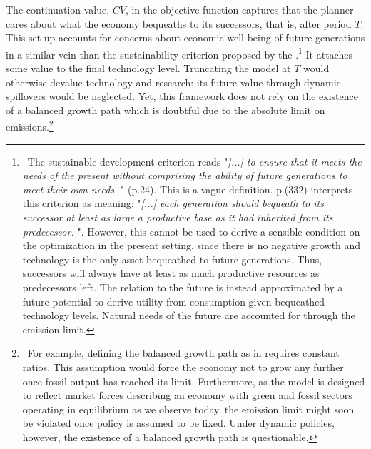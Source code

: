 The continuation value, $CV$, in the objective function captures that the planner cares about what the economy bequeaths to its successors, that is, after period $T$. 
This set-up accounts for concerns about economic well-being of future generations in a similar vein than the sustainability criterion proposed by the \cite{UNSUS}.\footnote{\ The sustainable development criterion reads "\textit{[...] to ensure that it meets the needs of the present without comprising the ability of future generations to meet their own needs.
	}" (p.24). This is a vague definition.  \cite{Dasgupta2021} p.(332) interprets this criterion as meaning: 
	"\textit{[...] each generation should bequeath to its successor at least as large a productive base as it had inherited from its predecessor. }". 
	However, this cannot be used to derive a sensible condition on the optimization in the present setting, since there is no negative growth and technology is the only asset bequeathed to future generations. Thus,
	successors will always have at least as much productive resources as predecessors left. The relation to the future is instead approximated by a future potential to derive utility from consumption given bequeathed technology levels. Natural needs of the future are accounted for through the emission limit. } It attaches some value to the final technology level. Truncating the model at $T$ would otherwise devalue technology and research: its future value through dynamic spillovers would be neglected.
 Yet, this framework does not rely on the existence of a balanced growth path which is doubtful due to the absolute limit on emissions.\footnote{\  For example, defining the balanced growth path as in \cite{Fried2018ClimateAnalysis} requires constant ratios. This assumption would force the economy not to grow any further once fossil output has reached its limit. Furthermore, as the model is designed to reflect market forces describing an economy with green and fossil sectors operating in equilibrium as we observe today, the emission limit might soon be violated once policy is assumed to be fixed. Under dynamic policies, however, the existence of a balanced growth path is questionable.}



